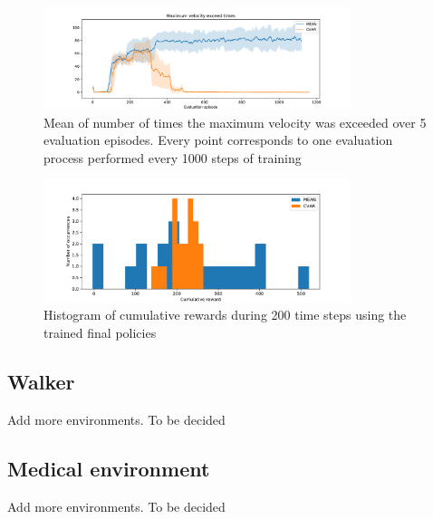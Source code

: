 \begin{figure}[ht]
    \centering
    \includegraphics[width=0.8\textwidth]{images/Cheetah_offpolicy_medium/times_exceedvel_withstds.pdf}
    \caption{Mean of number of times the maximum velocity was exceeded over 5 evaluation episodes.
    Every point corresponds to one evaluation process performed every 1000 steps of training}
    \label{vel_exceed_cheetah}

\end{figure}

\begin{figure}[ht]
    \centering
    \includegraphics[width=0.8\textwidth]{images/Cheetah_offpolicy_medium/hist_evaluation_numevalsteps200.pdf}
    \caption{Histogram of cumulative rewards during 200 time steps using the trained final policies}
    \label{hist_cum_rewards200steps_cheetah}

\end{figure}

\clearpage

\subsection{Walker}
Add more environments. To be decided
\subsection{Medical environment}
Add more environments. To be decided